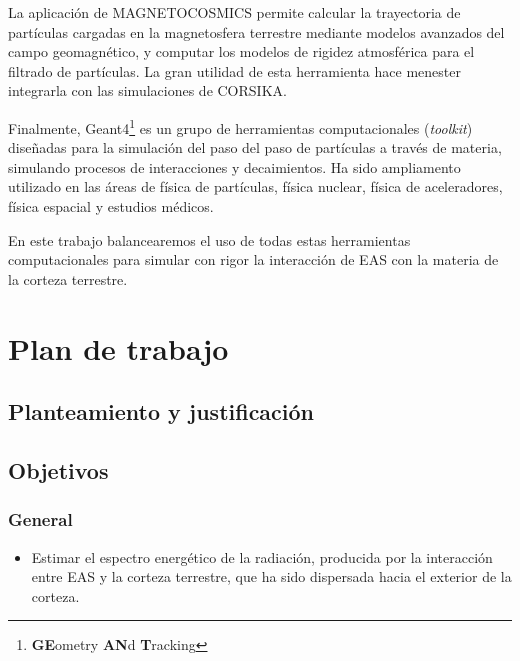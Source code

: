 \documentclass[12pt]{report}
\begin{document}
La aplicación de MAGNETOCOSMICS permite calcular la trayectoria de partículas cargadas en la magnetosfera terrestre mediante modelos avanzados del campo geomagnético, y computar los modelos de rigidez atmosférica para el filtrado de partículas. \cite{magnetocosmics} La gran utilidad de esta herramienta hace menester integrarla con las simulaciones de CORSIKA.

Finalmente, Geant4\footnote{\textbf{GE}ometry \textbf{AN}d \textbf{T}racking} es un grupo de herramientas computacionales (\textit{toolkit}) diseñadas para la simulación del paso del paso de partículas a través de materia, simulando procesos de interacciones y decaimientos. Ha sido ampliamento utilizado en las áreas de física de partículas, física nuclear, física de aceleradores, física espacial y estudios médicos. \cite{agostinelli2003geant4}

En este trabajo balancearemos el uso de todas estas herramientas computacionales para simular con rigor la interacción de EAS con la materia de la corteza terrestre.













\section*{Plan de trabajo}

\subsection*{Planteamiento y justificación}



\subsection*{Objetivos}

\subsubsection*{General}
\begin{itemize}
    \item Estimar el espectro energético de la radiación, producida por la interacción entre EAS y la corteza terrestre, que ha sido dispersada hacia el exterior de la corteza.
\end{itemize}
\end{document}
